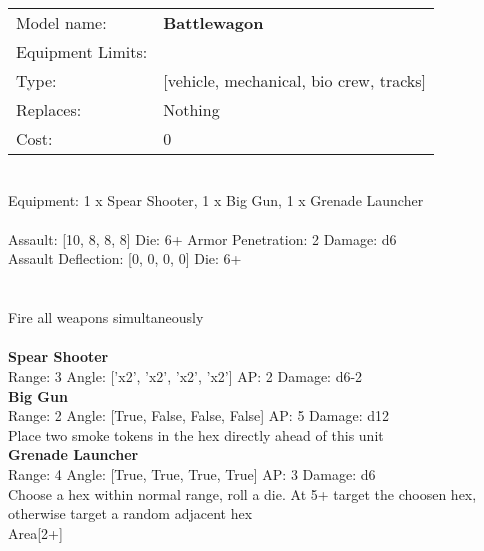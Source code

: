 \noindent
\begin{tabular}{ll}
Model name: &{\bf Battlewagon } \\
Equipment Limits: & \\
Type: &[vehicle, mechanical, bio crew, tracks] \\
Replaces: &Nothing \\
Cost: & 0\\
\end{tabular}
\ \\
Equipment: 1 x Spear Shooter, 1 x Big Gun, 1 x Grenade Launcher \\
\ \\
Assault: [10, 8, 8, 8] Die: 6+ Armor Penetration: 2 Damage: d6 \\
Assault Deflection: [0, 0, 0, 0] Die: 6+\\
\\ 
 
\ \\
Fire all weapons simultaneously\\ 

\ \\
{\bf Spear Shooter } \\



Range: 3  Angle: ['x2', 'x2', 'x2', 'x2'] AP: 2 Damage: d6-2 \\




{\bf Big Gun } \\



Range: 2  Angle: [True, False, False, False] AP: 5 Damage: d12 \\
Place two smoke tokens in the hex directly ahead of this unit\\ 




{\bf Grenade Launcher } \\



Range: 4  Angle: [True, True, True, True] AP: 3 Damage: d6 \\
Choose a hex within normal range, roll a die. At 5+ target the choosen hex, otherwise target a random adjacent hex\\ 
Area[2+]\\ 




 
\ \\













